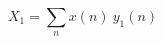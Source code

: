 \documentclass{article}
\begin{document}
 
\[
X_1 = \sum_n x(n)  \  y_1(n) 
\]
 \newpage 
\end{document}
